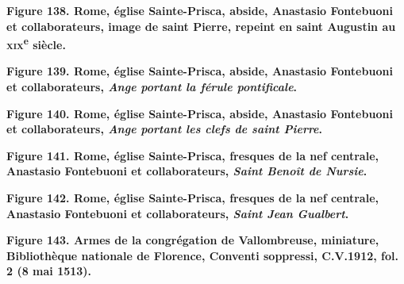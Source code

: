 \documentclass[12pt,twoside,openany]{book}
\begin{document}
\begin{center}
\par\small \textbf{Figure 138. Rome, église Sainte-Prisca, abside, Anastasio Fontebuoni et collaborateurs, image de saint Pierre, repeint en saint Augustin au \textsc{xix}\textsuperscript{e} siècle.}
\end{center}

\begin{center}
\par\small \textbf{Figure 139. Rome, église Sainte-Prisca, abside, Anastasio Fontebuoni et collaborateurs, \textit{Ange portant la férule pontificale}.}
\end{center}

\begin{center}
\par\small \textbf{Figure 140. Rome, église Sainte-Prisca, abside, Anastasio Fontebuoni et collaborateurs, \textit{Ange portant les clefs de saint Pierre}.}
\end{center}

\begin{center}
\par\small \textbf{Figure 141. Rome, église Sainte-Prisca, fresques de la nef centrale, Anastasio Fontebuoni et collaborateurs, \textit{Saint Benoît de Nursie}.}
\end{center}

\begin{center}
\par\small \textbf{Figure 142. Rome, église Sainte-Prisca, fresques de la nef centrale, Anastasio Fontebuoni et collaborateurs, \textit{Saint Jean Gualbert}.}
\end{center}

\begin{center}
\par\small \textbf{Figure 143. Armes de la congrégation de Vallombreuse, miniature, Bibliothèque nationale de Florence, Conventi soppressi, C.V.1912, fol. 2 (8 mai 1513).}
\end{center}
\end{document}
